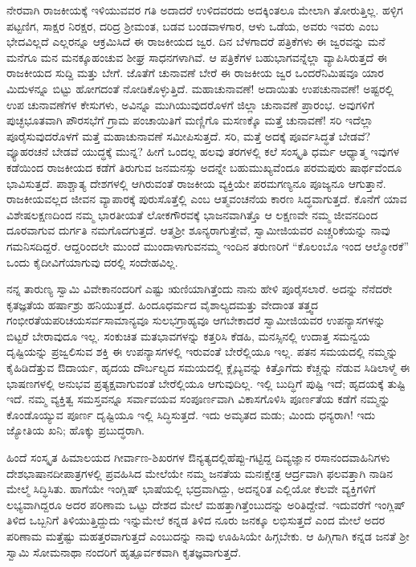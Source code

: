 ನೇರವಾಗಿ ರಾಜಕೀಯಕ್ಕೆ ಇಳಿಯುವವರ ಗತಿ ಅದಾದರೆ ಉಳಿದವರದು ಅದಕ್ಕಿಂತಲೂ ಮೇಲಾಗಿ ತೋರುತ್ತಿಲ್ಲ. ಹಳ್ಳಿಗ ಪಟ್ಟಣಿಗ, ಸಾಕ್ಷರ ನಿರಕ್ಷರ, ದರಿದ್ರ ಶ‍್ರೀಮಂತ, ಬಡವ ಬಂಡವಾಳಗಾರ, ಆಳು ಒಡೆಯ, ಅವರು ಇವರು ಎಂಬ ಭೇದವಿಲ್ಲದೆ ಎಲ್ಲರನ್ನೂ ಆಕ್ರಮಿಸಿದೆ ಈ ರಾಜಕೀಯದ ಜ್ವರ. ದಿನ ಬೆಳಗಾದರೆ ಪತ್ರಿಕೆಗಳು ಈ ಜ್ವರವನ್ನು ಮನೆ ಮನೆಗೂ ಮನ ಮನಕ್ಕೂಹಂಚುವ ಶೀಘ್ರ ಸಾಧನಗಳಾಗಿವೆ. ಆ ಪತ್ರಿಕೆಗಳ ಬಹುಭಾಗವನ್ನೆಲ್ಲಾ ವ್ಯಾಪಿಸಿರುತ್ತದೆ ಈ ರಾಜಕೀಯದ ಸುದ್ದಿ ಮತ್ತು ಬೇಗೆ. ಜೊತೆಗೆ ಚುನಾವಣೆ ಬೇರೆ ಈ ರಾಜಕೀಯ ಜ್ವರ ಒಂದರೆನಿಮಿಷವೂ ಯಾರ ಮಿದುಳನ್ನೂ ಬಿಟ್ಟು ಹೋಗದಂತೆ ನೋಡಿಕೊಳ್ಳುತ್ತಿದೆ. ಮಹಾಚುನಾವಣೆ! ಅದಾಯಿತು ಉಪಚುನಾವಣೆ! ಅಷ್ಟರಲ್ಲಿ ಉಪ ಚುನಾವಣೆಗಳ ಕೇಸುಗಳು, ಅವಿನ್ನೂ ಮುಗಿಯುವುದರೊಳಗೆ ಜಿಲ್ಲಾ ಚುನಾವಣೆ ಪ್ರಾರಂಭ. ಅವುಗಳಿಗೆ ಪುಚ್ಛಭೂತವಾಗಿ ಪೌರಸಭೆಗೆ ಗ್ರಾಮ ಪಂಚಾಯಿತಿಗೆ ಮಣ್ಣಿಗೊ ಮಸಣಕ್ಕೊ ಮತ್ತೆ ಚುನಾವಣೆ! ಸರಿ ಇದೆಲ್ಲಾ ಪೂರೈಸುವುದರೊಳಗೆ ಮತ್ತೆ ಮಹಾಚುನಾವಣೆ ಸಮೀಪಿಸುತ್ತದೆ. ಸರಿ, ಮತ್ತೆ ಅದಕ್ಕೆ ಪೂರ್ವಸಿದ್ಧತೆ ಬೇಡವೆ? ವ್ಯೂಹರಚನೆ ಬೇಡವೆ ಯುದ್ಧಕ್ಕೆ ಮುನ್ನ? ಹೀಗೆ ಒಂದಲ್ಲ ಹಲವು ತರಗಳಲ್ಲಿ ಕಲೆ ಸಂಸ್ಕೃತಿ ಧರ್ಮ ಆಧ್ಯಾತ್ಮ ಇವುಗಳ ಕಡೆಯಿಂದ ರಾಜಕೀಯದ ಕಡೆಗೆ ತಿರುಗುವ ಜನಮನಸ್ಸು ಅದನ್ನೇ ಬಹುಮುಖ್ಯವೆಂದೂ ಪರಮಪುರು ಷಾರ್ಥವೆಂದೂ ಭಾವಿಸುತ್ತದೆ. ಪಾಶ್ಚಾತ್ಯ ದೇಶಗಳಲ್ಲಿ ಆಗಿರುವಂತೆ ರಾಜಕೀಯ ವ್ಯಕ್ತಿಯೇ ಪರಮಗಣ್ಯನೂ ಪೂಜ್ಯನೂ ಆಗುತ್ತಾನೆ. ರಾಜಕೀಯವಲ್ಲದ ಜೀವನ ವ್ಯಾಪಾರಕ್ಕೆ ಪುರುಸೊತ್ತೆಲ್ಲಿ ಎಂಬ ಆತ್ಮವಂಚನೆಯ ಕಾರಣ ಸಿದ್ಧವಾಗುತ್ತದೆ. ಕೊನೆಗೆ ಯಾವ ವಿಶೇಷಲಕ್ಷಣದಿಂದ ನಮ್ಮ ಭಾರತೀಯತೆ ಲೋಕಗೌರವಕ್ಕೆ ಭಾಜನವಾಗಿತ್ತೊ ಆ ಲಕ್ಷಣವೇ ನಮ್ಮ ಜೀವನದಿಂದ ದೂರವಾಗುವ ದುರ್ಗತಿ ನಮಗೊದಗುತ್ತದೆ. ಆತ್ಮಶ‍್ರೀ ಶೂನ್ಯರಾಗುತ್ತೇವೆ, ಸ್ವಾಮೀಜಿಯವರ ಎಚ್ಚರಿಕೆಯನ್ನು ನಾವು ಗಮನಿಸದಿದ್ದರೆ. ಆದ್ದರಿಂದಲೇ ಮುಂದೆ ಮುಂದಾಳಾಗುವನಮ್ಮ ಇಂದಿನ ತರುಣರಿಗೆ “ಕೊಲಂಬೊ ಇಂದ ಆಲ್ಮೋರಕೆ” ಒಂದು ಕೈದೀವಿಗೆಯಾಗುವು ದರಲ್ಲಿ ಸಂದೇಹವಿಲ್ಲ.

ನನ್ನ ತಾರುಣ್ಯ ಸ್ವಾಮಿ ವಿವೇಕಾನಂದರಿಗೆ ಎಷ್ಟು ಋಣಿಯಾಗಿತ್ತೆಂದು ನಾನು ಹೇಳಿ ಪೂರೈಸಲಾರೆ. ಅದನ್ನು ನೆನೆದರೇ ಕೃತಜ್ಞತೆಯ ಹರ್ಷಾಶ್ರು ಹನಿಯುತ್ತದೆ. ಹಿಂದೂಧರ್ಮದ ವೈಶಾಲ್ಯದಮತ್ತು ವೇದಾಂತ ತತ್ತ್ವದ ಗಂಭೀರತೆಯಪರಿಚಯ\break ಸರ್ವಸಾಮಾನ್ಯವೂ ಸುಲಭಗ್ರಾಹ್ಯವೂ ಆಗಬೇಕಾದರೆ ಸ್ವಾಮೀಜಿಯವರ ಉಪನ್ಯಾಸಗಳನ್ನು ಬಿಟ್ಟರೆ ಬೇರಾವುದೂ ಇಲ್ಲ. ಸಂಕುಚಿತ ಮತಭಾವಗಳನ್ನು ಕತ್ತರಿಸಿ ಕೆಡಹಿ, ಮನಸ್ಸಿನಲ್ಲಿ ಉದಾತ್ತ ಸಮನ್ವಯ ದೃಷ್ಟಿಯನ್ನು ಪ್ರಜ್ವಲಿಸುವ ಶಕ್ತಿ ಈ ಉಪನ್ಯಾಸಗಳಲ್ಲಿ ಇರುವಂತೆ ಬೇರೆಲ್ಲಿಯೂ ಇಲ್ಲ. ಪತನ ಸಮಯದಲ್ಲಿ ನಮ್ಮನ್ನು ಕೈಹಿಡಿದೆತ್ತುವ ಔದಾರ್ಯ, ಹೃದಯ ದೌರ್ಬಲ್ಯದ ಸಮಯದಲ್ಲಿ ಕ್ಲೈಬ್ಯವನ್ನು ಕಿತ್ತೊಗೆದು ಕೆಚ್ಚನ್ನು ನೆಡುವ ಸಿಡಿಲಾಳ್ಮೆ ಈ ಭಾಷಣಗಳಲ್ಲಿ ಅನುಭವ ಪ್ರತ್ಯಕ್ಷವಾಗುವಂತೆ ಬೇರೆಲ್ಲಿಯೂ ಆಗುವುದಿಲ್ಲ. ಇಲ್ಲಿ ಬುದ್ಧಿಗೆ ಪುಷ್ಟಿ ಇದೆ; ಹೃದಯಕ್ಕೆ ತುಷ್ಟಿ ಇದೆ. ನಮ್ಮ ವ್ಯಕ್ತಿತ್ವ ಸಮಸ್ತವನ್ನೂ ಸರ್ವಾವಯವ ಸಂಪೂರ್ಣವಾಗಿ ವಿಕಾಸಗೊಳಿಸಿ ಪೂರ್ಣತೆಯ ಕಡೆಗೆ ನಮ್ಮನ್ನು ಕೊಂಡೊಯ್ಯುವ ಪೂರ್ಣ ದೃಷ್ಟಿಯೂ ಇಲ್ಲಿ ಸಿದ್ಧಿಸುತ್ತದೆ. ಇದು ಅಮೃತದ ಮಡು; ಮಿಂದು ಧನ್ಯರಾಗಿ! ಇದು ಜ್ಯೋತಿಯ ಖನಿ; ಹೊಕ್ಕು ಪ್ರಬುದ್ಧರಾಗಿ.

ಹಿಂದೆ ಸಂಸ್ಕೃತ ಹಿಮಾಲಯದ ಗೀರ್ವಾಣ-ಶಿಖರಗಳ ಔನ್ಯತ್ಯದಲ್ಲಿಹೆಪ್ಪು-ಗಟ್ಟಿದ್ದ ದಿವ್ಯಜ್ಞಾನ ರಸಾನಂದವಾಹಿನಿಗಳು ದೇಶಭಾಷಾನದೀಪಾತ್ರಗಳಲ್ಲಿ ಪ್ರವಹಿಸಿದ ಮೇಲೆಯೇ ನಮ್ಮ ಜನತೆಯ ಮನಃಕ್ಷೇತ್ರ ಆರ್ದ್ರವಾಗಿ ಫಲವತ್ತಾಗಿ ನಾಡಿನ ಮೇಲ್ಮೆ ಸಿದ್ಧಿಸಿತು. ಹಾಗೆಯೇ ಇಂಗ್ಲಿಷ್​ ಭಾಷೆಯಲ್ಲಿ ಭದ್ರವಾಗಿದ್ದು, ಅದನ್ನರಿತ ಎಲ್ಲಿಯೋ ಕೆಲವೇ ವ್ಯಕ್ತಿಗಳಿಗೆ ಲಭ್ಯವಾಗಿದ್ದರೂ ಅದರ ಪರಿಣಾಮ ಒಟ್ಟು ದೇಶದ ಮೇಲೆ ಮಹತ್ತಾಗಿತ್ತೆಂಬುದನ್ನು ಅರಿತಿದ್ದೇವೆ. ಇದುವರೆಗೆ ಇಂಗ್ಲಿಷ್​ ತಿಳಿದ ಒಬ್ಬನಿಗೆ ತಿಳಿಯುತ್ತಿದ್ದುದು ಇನ್ನುಮೇಲೆ ಕನ್ನಡ ತಿಳಿದ ನೂರು ಜನಕ್ಕೂ ಲಭಿಸುತ್ತದೆ ಎಂದ ಮೇಲೆ ಅದರ ಪರಿಣಾಮ ಮತ್ತೆಷ್ಟು ಮಹತ್ತರವಾಗುತ್ತದೆ ಎಂಬುದನ್ನು ನಾವು ಊಹಿಸಿಯೇ ಹಿಗ್ಗಬೇಕು. ಆ ಹಿಗ್ಗಿಗಾಗಿ ಕನ್ನಡ ಜನತೆ ಶ‍್ರೀ ಸ್ವಾಮಿ ಸೋಮನಾಥಾ ನಂದರಿಗೆ ಹೃತ್ಪೂರ್ವಕವಾಗಿ ಕೃತಜ್ಞವಾಗುತ್ತದೆ.

